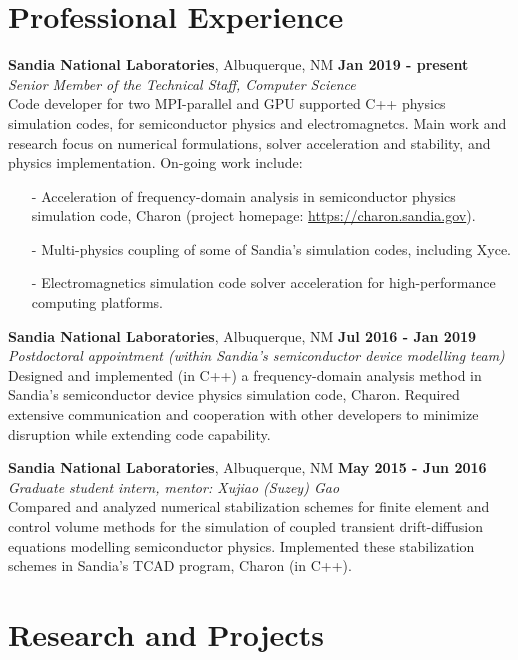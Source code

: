 \documentclass[margin,line]{res}
\begin{document}
\begin{resume}
\section{\sc Professional Experience}
{\bf Sandia National Laboratories}, Albuquerque, NM \hfill {\bf Jan 2019 - present}\\
{\em Senior Member of the Technical Staff, Computer Science}\\
Code developer for two MPI-parallel and GPU supported C++ physics simulation codes, for semiconductor physics and electromagnetcs. Main work and research focus on numerical formulations, solver acceleration and stability, and physics implementation. On-going work include:
\begin{itemize}
\setlength\itemsep{0pt}
\item[-] Acceleration of frequency-domain analysis in semiconductor physics simulation code, \newline Charon (project homepage: \url{https://charon.sandia.gov}).
\item[-] Multi-physics coupling of some of Sandia's simulation codes, including Xyce.
\item[-] Electromagnetics simulation code solver acceleration for high-performance computing platforms.
\end{itemize}

{\bf Sandia National Laboratories}, Albuquerque, NM \hfill {\bf Jul 2016 - Jan 2019}\\
{\em Postdoctoral appointment (within Sandia's semiconductor device modelling team)}\\
Designed and implemented (in C++) a frequency-domain analysis method in Sandia's semiconductor device physics simulation code, Charon. Required extensive communication and cooperation with other developers to minimize disruption while extending code capability.

{\bf Sandia National Laboratories}, Albuquerque, NM \hfill {\bf May 2015 - Jun 2016}\\
{\em Graduate student intern, mentor: Xujiao (Suzey) Gao}\\
Compared and analyzed numerical stabilization schemes for finite element and control volume methods for the simulation of coupled transient drift-diffusion equations modelling semiconductor physics. Implemented these stabilization schemes in Sandia's TCAD program, Charon (in C++).

\section{\sc Research and Projects}


\end{resume}
\end{document}
